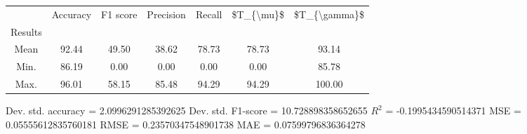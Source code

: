 \begin{tabular}{|c|c|c|c|c|c|c|}
\toprule
{} &  Accuracy &  F1 score &  Precision &  Recall &  \$T\_\{\textbackslash mu\}\$ &  \$T\_\{\textbackslash gamma\}\$ \\
Results &           &           &            &         &            &               \\
\hline
Mean    &     92.44 &     49.50 &      38.62 &   78.73 &      78.73 &         93.14 \\
Min.    &     86.19 &      0.00 &       0.00 &    0.00 &       0.00 &         85.78 \\
Max.    &     96.01 &     58.15 &      85.48 &   94.29 &      94.29 &        100.00 \\
\bottomrule
\end{tabular}

 Dev. std. accuracy = 2.0996291285392625
 Dev. std. F1-score = 10.728898358652655
 $R^2$ = -0.1995434590514371
 MSE = 0.05555612835760181
 RMSE = 0.23570347548901738
 MAE = 0.07599796836364278